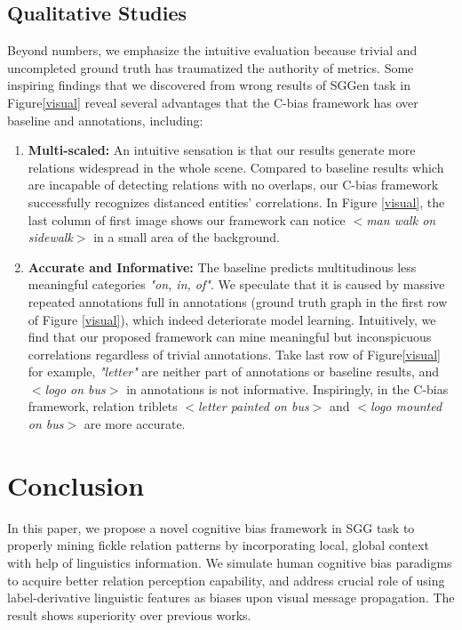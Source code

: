 \documentclass[runningheads]{llncs}
\begin{document}
\subsection{Qualitative Studies}
\label{qual}
Beyond numbers, we emphasize the intuitive evaluation because trivial and
uncompleted ground truth has traumatized the authority of metrics.    Some
inspiring findings that we discovered from wrong results of SGGen task in
Figure\ref{visual} reveal several advantages that the C-bias framework has over
baseline and annotations, including:

\begin{enumerate}
  \item \textbf{Multi-scaled:} An intuitive sensation is that our results
        generate more relations widespread in the whole scene. Compared to baseline
        results which are incapable of detecting relations with no overlaps, our C-bias
        framework successfully recognizes distanced entities' correlations. In Figure
        \ref{visual}, the last column of first image shows our framework can notice
        $<$\textit{man walk on sidewalk}$>$ in a small area of the background.

\item \textbf{Accurate and Informative:} The baseline predicts
        multitudinous less meaningful categories \textit{"on, in, of"}. We speculate
        that it is caused by massive repeated annotations full in annotations (ground
        truth graph in the first row of Figure \ref{visual}), which indeed deteriorate
        model learning. Intuitively, we find that our proposed framework can mine
        meaningful but inconspicuous correlations regardless of trivial annotations.
        Take last row of Figure\ref{visual} for example, \textit{"letter"} are neither
        part of annotations or baseline results, and  $<$\textit{logo on bus}$>$ in
        annotations is not informative. Inspiringly, in the C-bias framework, relation
        triblets  $<$\textit{letter painted on bus}$>$ and  $<$\textit{logo mounted on
          bus}$>$ are more accurate.
\end{enumerate}

\section{Conclusion}
In this paper, we propose a novel cognitive bias framework   in SGG task to
properly mining fickle relation patterns by incorporating local, global context
with help of linguistics information. We simulate human cognitive bias
paradigms to acquire better relation perception capability, and address crucial
role of using label-derivative linguistic features as biases upon visual
message propagation. The result shows superiority over previous works.

\clearpage


\end{document}
